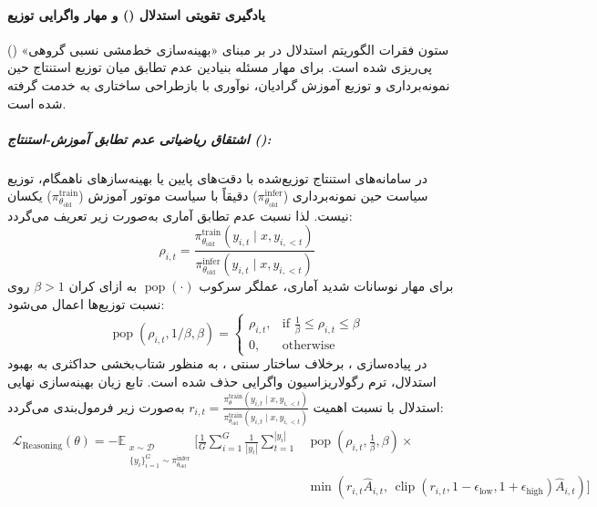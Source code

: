 \paragraph*{یادگیری تقویتی استدلال () و مهار واگرایی توزیع}
ستون فقرات الگوریتم استدلال در  بر مبنای «بهینه‌سازی خط‌مشی نسبی گروهی» () \cite{shao2024deepseekmath} پی‌ریزی شده است. برای مهار مسئله بنیادین عدم تطابق میان توزیع استنتاج حین نمونه‌برداری و توزیع آموزش گرادیان، نوآوری  \cite{zhao2025icepop} با بازطراحی ساختاری به خدمت گرفته شده است.

\subparagraph*{اشتقاق ریاضیاتی عدم تطابق آموزش-استنتاج ():}
در سامانه‌های استنتاج توزیع‌شده با دقت‌های پایین یا بهینه‌سازهای ناهمگام، توزیع سیاست حین نمونه‌برداری ($\pi_{\theta_{\text{old}}}^{\text{infer}}$) دقیقاً با سیاست موتور آموزش ($\pi_{\theta_{\text{old}}}^{\text{train}}$) یکسان نیست. لذا نسبت عدم تطابق آماری به‌صورت زیر تعریف می‌گردد:
\begin{equation}
    \rho_{i,t} = \frac{\pi_{\theta_{\text{old}}}^{\text{train}}(y_{i,t} \mid x, y_{i,<t})}{\pi_{\theta_{\text{old}}}^{\text{infer}}(y_{i,t} \mid x, y_{i,<t})}
\end{equation}
برای مهار نوسانات شدید آماری، عملگر سرکوب $\operatorname{pop}(\cdot)$ به ازای کران $\beta > 1$ روی نسبت توزیع‌ها اعمال می‌شود:
\begin{equation}
    \operatorname{pop}(\rho_{i,t}, 1/\beta, \beta) = \begin{cases} 
    \rho_{i,t}, & \text{if } \frac{1}{\beta} \le \rho_{i,t} \le \beta \\ 
    0, & \text{otherwise} 
    \end{cases}
\end{equation}
در پیاده‌سازی ، برخلاف ساختار سنتی ، به منظور شتاب‌بخشی حداکثری به بهبود استدلال، ترم رگولاریزاسیون واگرایی  حذف شده است. تابع زیان بهینه‌سازی نهایی استدلال با نسبت اهمیت $r_{i,t} = \frac{\pi_\theta^{\text{train}}(y_{i,t} \mid x, y_{i,<t})}{\pi_{\theta_{\text{old}}}^{\text{train}}(y_{i,t} \mid x, y_{i,<t})}$ به‌صورت زیر فرمول‌بندی می‌گردد:
\begin{equation}
\begin{aligned}
    \mathcal{L}_{\text{Reasoning}}(\theta) = -\mathbb{E}_{\substack{x \sim \mathcal{D} \\ \{y_i\}_{i=1}^G \sim \pi_{\theta_{\text{old}}}^{\text{infer}}}} \Bigg[ \frac{1}{G} \sum_{i=1}^G \frac{1}{|y_i|} \sum_{t=1}^{|y_i|} & \operatorname{pop}\left(\rho_{i,t}, \frac{1}{\beta}, \beta\right) \times \\
    & \min\left( r_{i,t}\hat{A}_{i,t}, \, \operatorname{clip}(r_{i,t}, 1-\epsilon_{\text{low}}, 1+\epsilon_{\text{high}})\hat{A}_{i,t} \right) \Bigg]
\end{aligned}
\end{equation}
